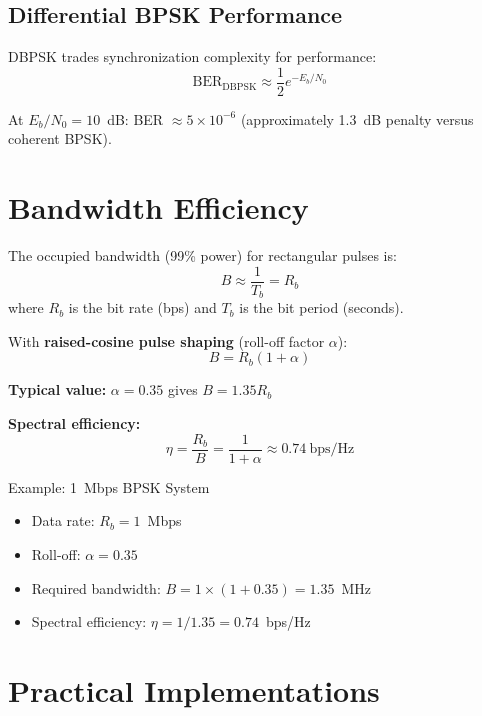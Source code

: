 \subsection{Differential BPSK Performance}

DBPSK trades synchronization complexity for performance:
\begin{equation}
\mathrm{BER}_{\mathrm{DBPSK}} \approx \frac{1}{2}e^{-E_b/N_0}
\end{equation}

At $E_b/N_0 = 10$~dB: BER $\approx 5 \times 10^{-6}$ (approximately 1.3~dB penalty versus coherent BPSK).

\section{Bandwidth Efficiency}

The occupied bandwidth (99\% power) for rectangular pulses is:
\begin{equation}
B \approx \frac{1}{T_b} = R_b
\end{equation}
where $R_b$ is the bit rate (bps) and $T_b$ is the bit period (seconds).

With \textbf{raised-cosine pulse shaping} (roll-off factor $\alpha$):
\begin{equation}
B = R_b(1 + \alpha)
\end{equation}

\textbf{Typical value:} $\alpha = 0.35$ gives $B = 1.35 R_b$

\textbf{Spectral efficiency:}
\begin{equation}
\eta = \frac{R_b}{B} = \frac{1}{1+\alpha} \approx 0.74\ \text{bps/Hz}
\end{equation}

\begin{calloutbox}{Example: 1~Mbps BPSK System}
\begin{itemize}
\item Data rate: $R_b = 1$~Mbps
\item Roll-off: $\alpha = 0.35$
\item Required bandwidth: $B = 1 \times (1 + 0.35) = 1.35$~MHz
\item Spectral efficiency: $\eta = 1/1.35 = 0.74$~bps/Hz
\end{itemize}
\end{calloutbox}

\section{Practical Implementations}

